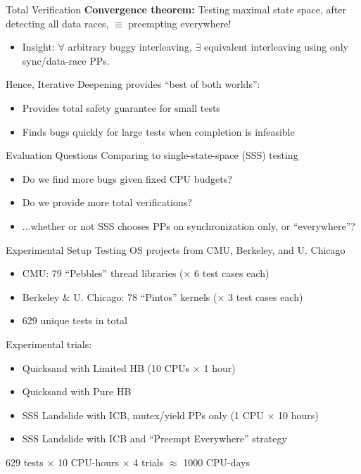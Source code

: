 \documentclass[xcolor=dvipsnames]{beamer}
\begin{document}
\begin{frame}{Total Verification}
	\textbf{Convergence theorem:} Testing maximal state space, after detecting all data races, $\equiv$ preempting everywhere!
	\begin{itemize}
		\item Insight: $\forall$ arbitrary buggy interleaving, $\exists$ equivalent interleaving %
			using only sync/data-race PPs.
	\end{itemize}
	\linegap

	Hence, Iterative Deepening provides ``best of both worlds'':
	\begin{itemize}
		\item Provides total safety guarantee for small tests
		\item Finds bugs quickly for large tests when completion is infeasible
	\end{itemize}
\end{frame}



\begin{frame}{Evaluation Questions}
	Comparing to single-state-space (SSS) testing
	\begin{itemize}
		\item Do we find more bugs given fixed CPU budgets?
		\item Do we provide more total verifications?
		\item ...whether or not SSS chooses PPs on synchronization only, or ``everywhere''?
	\end{itemize}
\end{frame}

\begin{frame}{Experimental Setup}
	Testing OS projects from CMU, Berkeley, and U. Chicago
	\begin{itemize}
		\item CMU: 79 ``Pebbles'' thread libraries ($\times$ 6 test cases each)
		\item Berkeley \& U. Chicago: 78 ``Pintos'' kernels ($\times$ 3 test cases each)
		\item 629 unique tests in total
	\end{itemize}
	\pause
	\linegap
	
	Experimental trials:
	\begin{itemize}
		\item Quicksand with Limited HB (10 CPUs $\times$ 1 hour)
		\item Quicksand with Pure HB
		\item SSS Landslide with ICB, mutex/yield PPs only (1 CPU $\times$ 10 hours)
		\item SSS Landslide with ICB and ``Preempt Everywhere'' strategy
	\end{itemize}
	\pause
	\linegap

	629 tests $\times$ 10 CPU-hours $\times$ 4 trials $\approx$ 1000 CPU-days
\end{frame}
\end{document}

